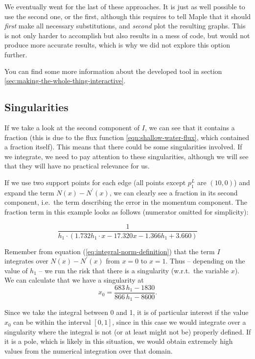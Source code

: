 \documentclass{article}
\begin{document}
We eventually went for the last of these approaches. It is just as well possible to use the second one, or the first, although this requires to tell Maple that it should \emph{first} make all necessary substitutions, and \emph{second} plot the resulting graphs. This is not only harder to accomplish but also results in a mess of code, but would not produce more accurate results, which is why we did not explore this option further.

You can find some more information about the developed tool in section \ref{sec:making-the-whole-thing-interactive}.

\subsection{Singularities}
\label{sec:singularities}

If we take a look at the second component of $I$, we can see that it contains a fraction (this is due to the flux function \ref{eqn:shallow-water-flux}, which contained a fraction itself). This means that there could be some singularities involved. If we integrate, we need to pay attention to these singularities, although we will see that they will have no practical relevance for us.

If we use two support points for each edge (all points except $p_1^L$ are $(10,0)$) and expand the term $N\left(x\right)-N^\prime\left(x\right)$, we can clearly see a fraction in its second component, i.e.\, the term describing the error in the momentum component. The fraction term in this example looks as follows (numerator omitted for simplicity):

\begin{equation*}
  \frac{1}{h_1\cdot(1.732 h_1 \cdot x - 17.320 x - 1.366 h_1 + 3.660)}
\end{equation*}

Remember from equation (\ref{eq:integral-norm-definition}) that the term $I$ integrates over $N\left(x\right)-N^\prime\left(x\right)$ from $x=0$ to $x=1$. Thus -- depending on the value of $h_1$ -- we run the risk that there is a singularity (w.r.t.\, the variable $x$). We can calculate that we have a singularity at
\begin{equation*}
  x_0=\frac{683\, h_1 - 1830}{866\, h_1 - 8600}.
\end{equation*}

Since we take the integral between 0 and 1, it is of particular interest if the value $x_0$ can be within the interval $\left[ 0,1 \right]$, since in this case we would integrate over a singularity where the integral is not (or at least might not be) properly defined. If it is a pole, which is likely in this situation, we would obtain extremely high values from the numerical integration over that domain.
\end{document}
